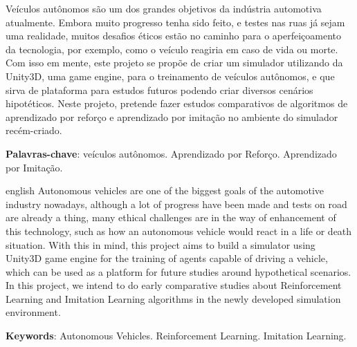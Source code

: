 
\setlength{\absparsep}{18pt} %
\begin{resumo}
Veículos autônomos são um dos grandes objetivos da indústria automotiva atualmente. Embora muito progresso tenha sido feito, e testes nas ruas já sejam uma realidade, muitos desafios éticos estão no caminho para o aperfeiçoamento da tecnologia, por exemplo, como o veículo reagiria em caso de vida ou morte. Com isso em mente, este projeto se propõe de criar um simulador utilizando da Unity3D, uma game engine, para o treinamento de veículos autônomos, e que sirva de plataforma para estudos futuros podendo criar diversos cenários hipotéticos. Neste projeto, pretende fazer estudos comparativos de algoritmos de aprendizado por reforço e aprendizado por imitação no ambiente do simulador recém-criado.

 \textbf{Palavras-chave}: veículos autônomos. Aprendizado por Reforço. Aprendizado por Imitação.
\end{resumo}

\begin{resumo}[Abstract]
 \begin{otherlanguage*}{english}
   Autonomous vehicles are one of the biggest goals of the automotive industry nowadays, although a lot of progress have been made and tests on road are already a thing, many ethical challenges are in the way of enhancement of this technology, such as how an autonomous vehicle would react in a life or death situation. With this in mind, this project aims to build a simulator using Unity3D game engine for the training of agents capable of driving a vehicle, which can be used as a platform for future studies around hypothetical scenarios. In this project, we intend to do early comparative studies about Reinforcement Learning and Imitation Learning algorithms in the newly developed simulation environment.

   \vspace{\onelineskip}
 
   \noindent 
   \textbf{Keywords}: Autonomous Vehicles. Reinforcement Learning. Imitation Learning.
 \end{otherlanguage*}
\end{resumo}